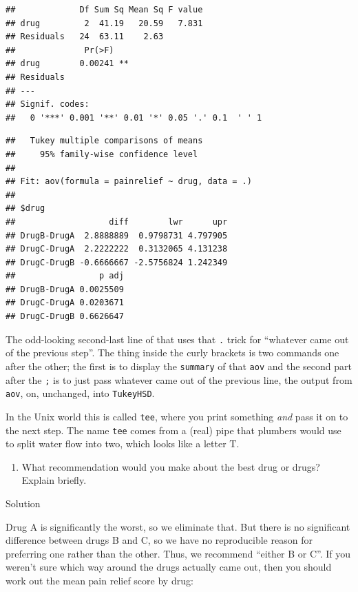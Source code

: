 \documentclass[]{tufte-book}
\providecommand{\tightlist}{%
  \setlength{\itemsep}{0pt}\setlength{\parskip}{0pt}}
\theoremstyle{definition}
\theoremstyle{definition}
\theoremstyle{definition}
\theoremstyle{remark}
\begin{document}
\begin{verbatim}
##             Df Sum Sq Mean Sq F value
## drug         2  41.19   20.59   7.831
## Residuals   24  63.11    2.63        
##              Pr(>F)   
## drug        0.00241 **
## Residuals             
## ---
## Signif. codes:  
##   0 '***' 0.001 '**' 0.01 '*' 0.05 '.' 0.1  ' ' 1
\end{verbatim}

\begin{verbatim}
##   Tukey multiple comparisons of means
##     95% family-wise confidence level
## 
## Fit: aov(formula = painrelief ~ drug, data = .)
## 
## $drug
##                   diff        lwr      upr
## DrugB-DrugA  2.8888889  0.9798731 4.797905
## DrugC-DrugA  2.2222222  0.3132065 4.131238
## DrugC-DrugB -0.6666667 -2.5756824 1.242349
##                 p adj
## DrugB-DrugA 0.0025509
## DrugC-DrugA 0.0203671
## DrugC-DrugB 0.6626647
\end{verbatim}

The odd-looking second-last line of that uses that \texttt{.} trick for
``whatever came out of the previous step''. The thing inside the curly
brackets is two commands one after the other; the first is to display
the \texttt{summary} of that \texttt{aov}
and the second part after the \texttt{;} is to just pass whatever came
out of the previous line, the output from \texttt{aov}, on, unchanged,
into \texttt{TukeyHSD}.

In the Unix world this is called \texttt{tee}, where you print something
\emph{and} pass it on to the next step. The name \texttt{tee} comes from
a (real) pipe that plumbers would use to split water flow into two,
which looks like a letter T.

\begin{enumerate}
\def\labelenumi{(\alph{enumi})}
\setcounter{enumi}{5}
\tightlist
\item
  What recommendation would you make about the best drug or drugs?
  Explain briefly.
\end{enumerate}

Solution

Drug A is significantly the worst, so we eliminate that. But there is no
significant difference between drugs B and C, so we have no reproducible
reason for preferring one rather than the other. Thus, we recommend
``either B or C''. If you weren't sure which way around the drugs
actually came out, then you should work out the mean pain relief score
by drug:
\end{document}
